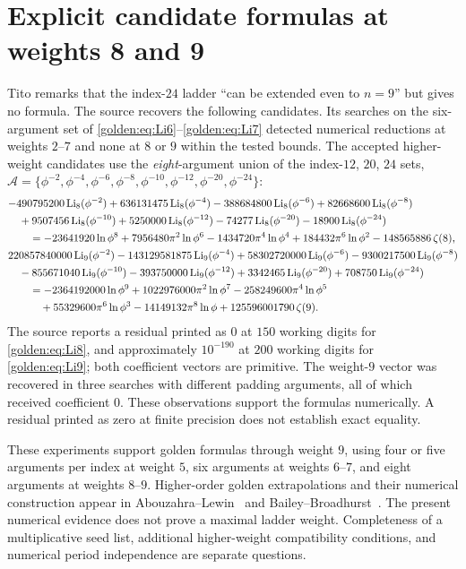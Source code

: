 \section{Explicit candidate formulas at weights 8 and 9}
Tito remarks that the index-$24$ ladder ``can be extended even to $n=9$''
but gives no formula. The source recovers the following candidates.
Its searches on the six-argument set of
\eqref{golden:eq:Li6}--\eqref{golden:eq:Li7} detected numerical reductions
at weights $2$--$7$ and none at $8$ or $9$ within the tested bounds.
The accepted higher-weight candidates use the \emph{eight}-argument union
of the index-$12$, $20$, $24$
sets, $\mathcal A=\{\phi^{-2},\phi^{-4},\phi^{-6},\phi^{-8},\phi^{-10},\phi^{-12},\phi^{-20},\phi^{-24}\}$:
{\scriptsize
\begin{align}
\label{golden:eq:Li8}
  &{-}490795200\operatorname{Li}_8(\phi^{-2})+636131475\operatorname{Li}_8(\phi^{-4})-388684800\operatorname{Li}_8(\phi^{-6})+82668600\operatorname{Li}_8(\phi^{-8})\notag\\
  &\quad+9507456\operatorname{Li}_8(\phi^{-10})+5250000\operatorname{Li}_8(\phi^{-12})-74277\operatorname{Li}_8(\phi^{-20})-18900\operatorname{Li}_8(\phi^{-24})\notag\\
  &\qquad=-23641920\ln\phi^8+7956480\pi^2\ln\phi^6-1434720\pi^4\ln\phi^4+184432\pi^6\ln\phi^2-148565886\,\zeta(8),\\
\label{golden:eq:Li9}
  &220857840000\operatorname{Li}_9(\phi^{-2})-143129581875\operatorname{Li}_9(\phi^{-4})+58302720000\operatorname{Li}_9(\phi^{-6})-9300217500\operatorname{Li}_9(\phi^{-8})\notag\\
  &\quad-855671040\operatorname{Li}_9(\phi^{-10})-393750000\operatorname{Li}_9(\phi^{-12})+3342465\operatorname{Li}_9(\phi^{-20})+708750\operatorname{Li}_9(\phi^{-24})\notag\\
  &\qquad=-2364192000\ln\phi^9+1022976000\pi^2\ln\phi^7-258249600\pi^4\ln\phi^5\notag\\ &\qquad\quad+55329600\pi^6\ln\phi^3-14149132\pi^8\ln\phi+125596001790\,\zeta(9).
\end{align}}
The source reports a residual printed as $0$ at $150$ working digits for
\eqref{golden:eq:Li8}, and approximately $10^{-190}$ at $200$ working
digits for \eqref{golden:eq:Li9}; both coefficient vectors are primitive.
The weight-$9$ vector was recovered in three searches with different
padding arguments, all of which received coefficient $0$.
These observations support the formulas numerically. A residual printed
as zero at finite precision does not establish exact equality.
\begin{remark}
These experiments support golden formulas through weight $9$, using
four or five arguments per index at weight $5$, six arguments at weights
$6$--$7$, and eight arguments at weights $8$--$9$.
Higher-order golden extrapolations and their numerical construction
appear in Abouzahra--Lewin~\cite{golden:AbouzahraLewin1985} and
Bailey--Broadhurst~\cite{golden:BaileyBroadhurst1999}.
The present numerical evidence does not prove a maximal ladder weight.
Completeness of a multiplicative seed list, additional higher-weight
compatibility conditions, and numerical period independence are separate
questions.
\end{remark}

